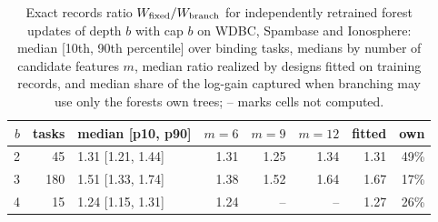\begin{table}[t]
\centering
\caption{Exact records ratio $W_{\rm fixed}/W_{\rm branch}$ for independently retrained forest updates of depth $b$ with cap $b$ on WDBC, Spambase and Ionosphere: median [10th, 90th percentile] over binding tasks, medians by number of candidate features $m$, median ratio realized by designs fitted on training records, and median share of the log-gain captured when branching may use only the forests\textquotesingle{} own trees; -- marks cells not computed.}
\label{tab:capgrid}
\footnotesize
\setlength{\tabcolsep}{2.4pt}
\begin{tabular}{rrlrrrrr}
\toprule
$b$ & tasks & median [p10, p90] & $m{=}6$ & $m{=}9$ & $m{=}12$ & fitted & own \\
\midrule
2 & 45 & 1.31 [1.21, 1.44] & 1.31 & 1.25 & 1.34 & 1.31 & 49\% \\
3 & 180 & 1.51 [1.33, 1.74] & 1.38 & 1.52 & 1.64 & 1.67 & 17\% \\
4 & 15 & 1.24 [1.15, 1.31] & 1.24 & -- & -- & 1.27 & 26\% \\
\bottomrule
\end{tabular}
\end{table}
